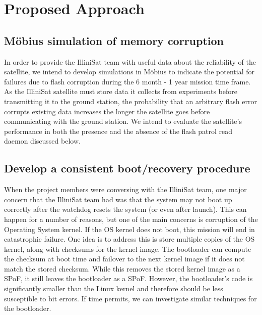 \section{Proposed Approach}
\subsection{M\"obius simulation of memory corruption}
In order to provide the IlliniSat team with useful data about the reliability of the satellite, we intend to develop simulations in M\"obius to indicate the potential for failures due to flash corruption during the 6 month - 1 year mission time frame.  As the IlliniSat satellite must store data it collects from experiments before transmitting it to the ground station, the probability that an arbitrary flash error corrupts existing data increases the longer the satellite goes before communicating with the ground station.  We intend to evaluate the satellite's performance in both the presence and the absence of the flash patrol read daemon discussed below.

\subsection{Develop a consistent boot/recovery procedure}
When the project members were conversing with the IlliniSat team, one major
concern that the IlliniSat team had was that the system may not boot up
correctly after the watchdog resets the system (or even after launch).  This can
happen for a number of reasons, but one of the main concerns is corruption of
the Operating System kernel.  If the OS kernel does not boot, this mission will
end in catastrophic failure.  One idea is to address this is store multiple
copies of the OS kernel, along with checksums for the kernel image.  The
bootloader can compute the checksum at boot time and failover to the next kernel
image if it does not match the stored checksum.  While this removes the stored
kernel image as a SPoF, it still leaves the bootloader as a SPoF.  However, the
bootloader's code is significantly smaller than the Linux kernel and therefore
should be less susceptible to bit errors.  If time permits, we can investigate
similar techniques for the bootloader. 

